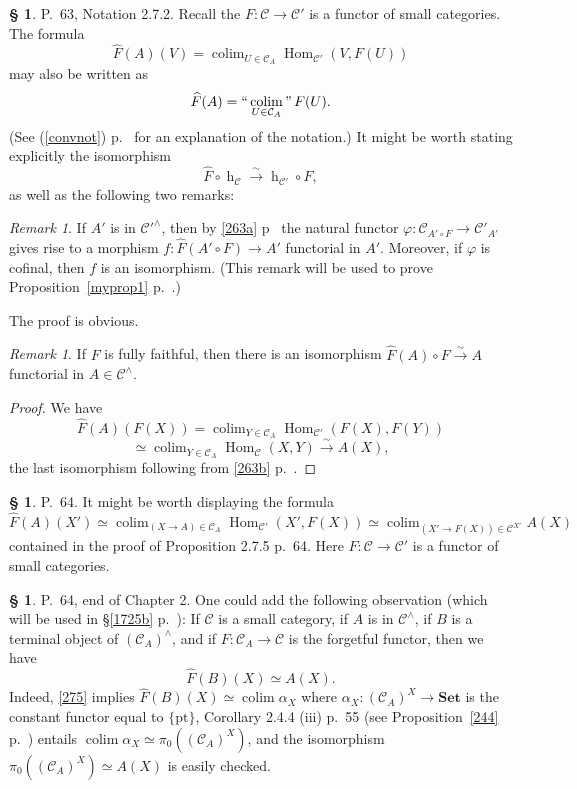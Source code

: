 \documentclass[12pt]{article}
\theoremstyle{remark}
\newtheorem{rk}[thm]{Remark}
\theoremstyle{definition}
\newtheorem{s}[thm]{\S}
\newcommand{\cc}{\mathcal}
\newcommand{\C}{\mathcal C}
\newcommand{\pt}{\{\text{pt}\}}
\newcommand{\Set}{\mathbf{Set}}
\newcommand{\xr}{\xrightarrow}
\newcommand{\cn}{(See (\ref{convnot}) p.~\pageref{convnot} for an explanation of the notation.) }%
\DeclareMathOperator*{\coli}{colim}
\DeclareMathOperator*{\co}{colim}
\DeclareMathOperator*{\icolim}{``\coli"}
\DeclareMathOperator{\hy}{h}
\DeclareMathOperator{\Hom}{Hom}%
\begin{document}
%
%
\begin{s} 
P.~63, Notation 2.7.2. Recall the $F:\C\to\C'$ is a functor of small categories. The formula 
$$
\widehat F(A)(V)=\coli_{U\in\C_A}\Hom_{\C'}(V,F(U))
$$
may also be written as 
$$
\widehat F(A)=\icolim_{U\in\C_A}F(U).
$$
\cn It might be worth stating explicitly the isomorphism 
$$
\widehat F\circ\hy_\C\xr\sim\hy_{\C'}\circ F,
$$
as well as the following two remarks:
%
\begin{rk}\label{cof}
If $A'$ is in $\cc C'^\wedge$, then by \eqref{263a} p~\pageref{263a} the natural functor $\varphi:\cc C_{A'\circ F}\to\cc C'_{A'}$ gives rise to a morphism $f:\widehat F(A'\circ F)\to A'$ functorial in $A'$. Moreover, if $\varphi$ is cofinal, then $f$ is an isomorphism. (This remark will be used to prove Proposition~\ref{myprop1} p.~\pageref{myprop1}.)
\end{rk}

The proof is obvious.
%
\begin{rk}
If $F$ is fully faithful, then there is an isomorphism $\widehat F(A)\circ F\xr\sim A$ functorial in $A\in\C^\wedge$.
\end{rk} 
%
\begin{proof}
We have 
$$
\widehat F(A)(F(X))=\coli_{Y\in\C_A}\Hom_{\C'}(F(X),F(Y))
$$
$$
\simeq\coli_{Y\in\C_A}\Hom_\C(X,Y)\xr\sim A(X),
$$
the last isomorphism following from \eqref{263b} p.~\pageref{263b}.
\end{proof}
\end{s}
%
\begin{s} 
P.~64. It might be worth displaying the formula 
\begin{equation}\label{275}
\widehat F(A)(X')\simeq\co_{(X\to A)\in\C_A}\Hom_{\C'}(X',F(X))\simeq
\co_{(X'\to F(X))\in\C^{X'}}A(X)
\end{equation}
contained in the proof of Proposition 2.7.5 p.~64. Here $F:\C\to\C'$ is a functor of small categories. 
\end{s}
%
%
\begin{s}
P.~64, end of Chapter 2. One could add the following observation (which will be used in \S\ref{1725b} p.~\pageref{1725b}): If $\C$ is a small category, if $A$ is in $\C^\wedge$, if $B$ is a terminal object of $(\C_A)^\wedge$, and if $F:\C_A\to\C$ is the forgetful functor, then we have 
\begin{equation}\label{1725}
\widehat F(B)(X)\simeq A(X).
\end{equation}
Indeed, \eqref{275} implies $\widehat F(B)(X)\simeq\co\alpha_X$ where $\alpha_X:(\C_A)^X\to\Set$ is the constant functor equal to $\pt$, Corollary 2.4.4 (iii) p.~55 (see Proposition~\ref{244} p.~\pageref{244}) entails $\co\alpha_X\simeq\pi_0((\C_A)^X)$, and the isomorphism $\pi_0((\C_A)^X)\simeq A(X)$ is easily checked.
\end{s}
%
%
\end{document}
